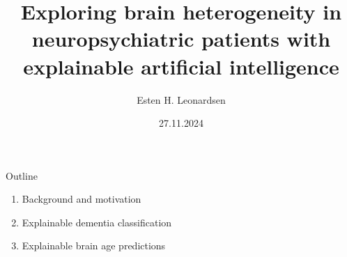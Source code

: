 \documentclass{beamer}
\title{Exploring brain heterogeneity in neuropsychiatric patients with explainable artificial intelligence}
\date{27.11.2024}
\author{Esten H. Leonardsen}
\begin{document}
    \begin{frame}
        \titlepage
    \end{frame}

    \begin{frame}{Outline}
        \begin{enumerate}
            \item Background and motivation
            \item Explainable dementia classification
            \item Explainable brain age predictions
        \end{enumerate}
    \end{frame}

    
    
    
    
\end{document}
